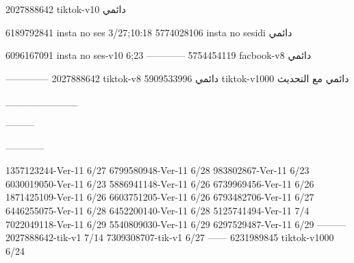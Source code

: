 2027888642 tiktok-v10
دائمي

6189792841 insta no ses
3/27;10:18
5774028106 insta no sesidi
دائمي

6096167091 insta no ses-v10
6;23
------------
5754454119 facbook-v8
دائمي


--------------
2027888642 tiktok-v8
دائمي
5909533996 tiktok-v1000
دائمي مع التحديث

__________

---------


------------

1357123244-Ver-11
6/27
6799580948-Ver-11
6/28
983802867-Ver-11
6/23
6030019050-Ver-11
6/23
5886941148-Ver-11
6/26
6739969456-Ver-11
6/26
1871425109-Ver-11
6/26
6603751205-Ver-11
6/26
6793482706-Ver-11
6/27
6446255075-Ver-11
6/28
6452200140-Ver-11
6/28
5125741494-Ver-11
7/4
7022049118-Ver-11
6/29
5540809030-Ver-11
6/29
6297529487-Ver-11
6/29
---------
2027888642-tik-v1
7/14
7309308707-tik-v1
6/27
------
6231989845 tiktok-v1000
6/24
